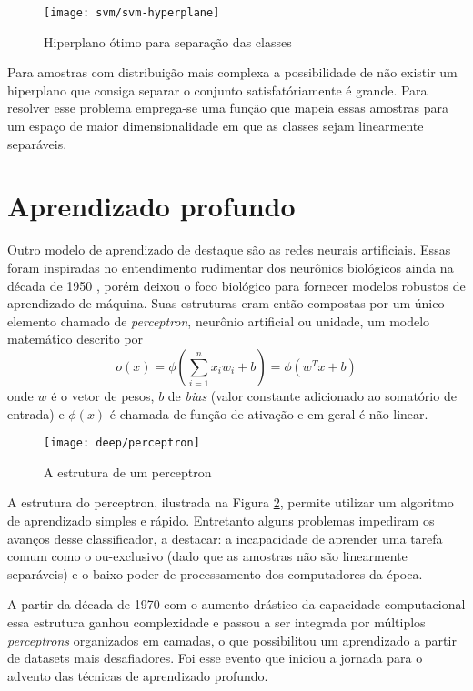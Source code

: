 \begin{figure}
\centering
\texttt{[image: svm/svm-hyperplane]}
\caption{Hiperplano ótimo para separação das classes}
\label{fig:svm-hyperplane}
\end{figure}

Para amostras com distribuição mais complexa a possibilidade de não existir um hiperplano que consiga separar o conjunto satisfatóriamente é grande. Para resolver esse problema emprega-se uma função que mapeia essas amostras para um espaço de maior dimensionalidade em que as classes sejam linearmente separáveis.

\section{Aprendizado profundo}
\label{introducao:perceptron}
Outro modelo de aprendizado de destaque são as redes neurais artificiais. Essas foram inspiradas no entendimento rudimentar dos neurônios biológicos ainda na década de 1950 \cite{perceptron1957}, porém deixou o foco biológico para fornecer modelos robustos de aprendizado de máquina. Suas estruturas eram então compostas por um único elemento chamado de \textit{perceptron}, neurônio artificial ou unidade, um modelo matemático descrito por
\begin{equation}
\label{eq:perceptron}
o(x) = \phi\left(\sum_{i=1}^n x_i w_i+b\right) = \phi\left(w^T x+b\right)
\end{equation}
onde $w$ é o vetor de pesos, $b$ de \textit{bias} (valor constante adicionado ao somatório de entrada) e $\phi(x)$ é chamada de função de ativação e em geral é não linear. 

\begin{figure}
\centering
\texttt{[image: deep/perceptron]}
\caption{A estrutura de um perceptron}
\label{fig:perceptron}
\end{figure}

A estrutura do perceptron, ilustrada na Figura \ref{fig:perceptron}, permite utilizar um algoritmo de aprendizado simples e rápido. Entretanto alguns problemas impediram os avanços desse classificador, a destacar: a incapacidade de aprender uma tarefa comum como o ou-exclusivo (dado que as amostras não são linearmente separáveis) e o baixo poder de processamento dos computadores da época.

A partir da década de 1970 com o aumento drástico da capacidade computacional essa estrutura ganhou complexidade e passou a ser integrada por múltiplos \textit{perceptrons} organizados em camadas, o que possibilitou um aprendizado a partir de datasets mais desafiadores. Foi esse evento que iniciou a jornada para o advento das técnicas de aprendizado profundo.


